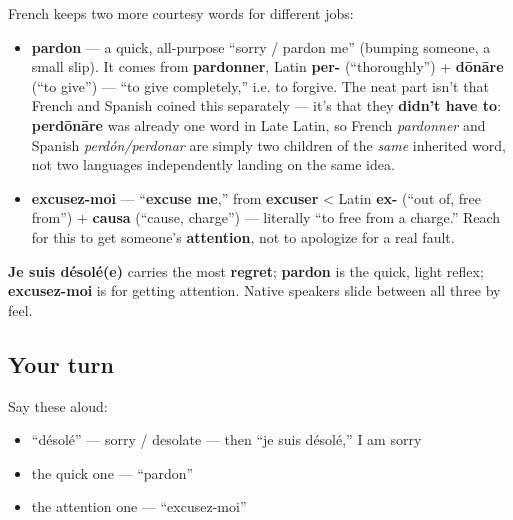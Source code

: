 \begin{culture}
French keeps two more courtesy words for different jobs:

\begin{itemize}
\raggedright
  \item \textbf{pardon} — a quick, all-purpose \textquotedblleft{}sorry / pardon me\textquotedblright{} (bumping someone, a small slip). It comes from \textbf{pardonner}, Latin \textbf{per-} (\textquotedblleft{}thoroughly\textquotedblright{}) + \textbf{dōnāre} (\textquotedblleft{}to give\textquotedblright{}) — \textquotedblleft{}to give completely,\textquotedblright{} i.e. to forgive. The neat part isn't that French and Spanish coined this separately — it's that they \textbf{didn't have to}: \textbf{perdōnāre} was already one word in Late Latin, so French \emph{pardonner} and Spanish \emph{perdón/perdonar} are simply two children of the \emph{same} inherited word, not two languages independently landing on the same idea.
  \item \textbf{excusez-moi} — \textquotedblleft{}\textbf{excuse me},\textquotedblright{} from \textbf{excuser} < Latin \textbf{ex-} (\textquotedblleft{}out of, free from\textquotedblright{}) + \textbf{causa} (\textquotedblleft{}cause, charge\textquotedblright{}) — literally \textquotedblleft{}to free from a charge.\textquotedblright{} Reach for this to get someone's \textbf{attention}, not to apologize for a real fault.
\end{itemize}

\textbf{Je suis désolé(e)} carries the most \textbf{regret}; \textbf{pardon} is the quick, light reflex; \textbf{excusez-moi} is for getting attention. Native speakers slide between all three by feel.
\end{culture}

\subsection*{Your turn}
Say these aloud:

\begin{itemize}
\raggedright
  \item \textquotedblleft{}désolé\textquotedblright{} — sorry / desolate — then \textquotedblleft{}je suis désolé,\textquotedblright{} I am sorry
  \item the quick one — \textquotedblleft{}pardon\textquotedblright{}
  \item the attention one — \textquotedblleft{}excusez-moi\textquotedblright{}
\end{itemize}

